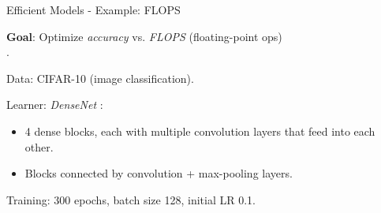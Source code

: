 \documentclass[11pt,compress,t,notes=noshow,xcolor=table]{beamer}
\begin{document}
\begin{vbframe}{Efficient Models - Example: FLOPS}

\textbf{Goal}: Optimize \emph{accuracy} vs. \emph{FLOPS} (floating-point ops) \\
.

\bigskip
Data: CIFAR-10 (image classification).

\bigskip
Learner: \emph{DenseNet} :
\begin{itemize}
  \item 4 dense blocks, each with multiple convolution layers that feed into each other.
  \item Blocks connected by convolution + max-pooling layers.
\end{itemize}

Training: 300 epochs, batch size 128, initial LR 0.1.

\end{vbframe}
\end{document}
